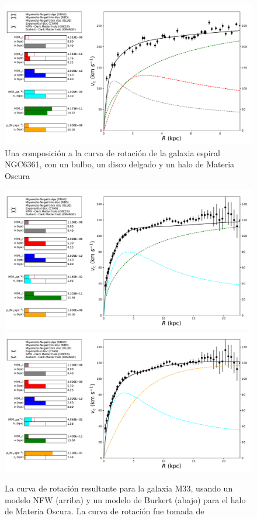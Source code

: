 \begin{figure}
  \centering
  \includegraphics[width=\columnwidth]{Kap2/curve_RotPy.pdf}
  \caption{Una composición a la curva de rotación de la galaxia espiral  NGC6361, con un bulbo, un disco delgado y un halo de Materia Oscura}
  \label{fig:Fi4}
\end{figure}


\begin{figure}
  \centering
    \includegraphics[width=\columnwidth]{Kap2/M33_rot_curve.pdf}
    \includegraphics[width=\columnwidth]{Kap2/M33_Burkert.pdf}
  \caption{La curva de rotación resultante para la galaxia M33, usando un modelo NFW (arriba) y un modelo de Burkert (abajo) para el halo de Materia Oscura. La curva de rotación fue tomada de \cite{C14}}
  \label{fig:FigM33RC}
\end{figure}



